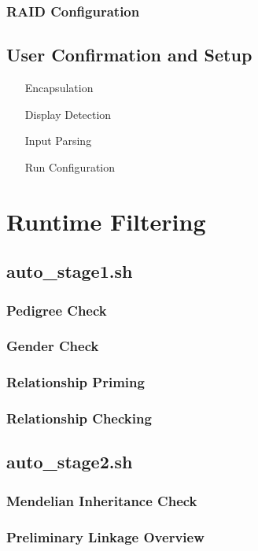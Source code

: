 \subsubsection{RAID Configuration}

\subsection{User Confirmation and Setup}
\begin{enumerate}
\item[Encapsulation]{}
\item[Display Detection]{}
\item[Input Parsing]{}
\item[Run Configuration]{}
\end{enumerate}



\section{Runtime Filtering}

\subsection{auto_stage1.sh}
\subsubsection{Pedigree Check}
\subsubsection{Gender Check}
\subsubsection{Relationship Priming}
\subsubsection{Relationship Checking}

\subsection{auto_stage2.sh}
\subsubsection{Mendelian Inheritance Check}
\subsubsection{Preliminary Linkage Overview}

